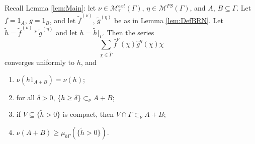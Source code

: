 \documentclass[12pt]{amsart} \usepackage{amsmath,centernot,amssymb,leftindex}
\numberwithin{theorem}{section}
\numberwithin{equation}{section}
\theoremstyle{definition}
\begin{document}
	
	

	
\noindent Recall Lemma \ref{lem:Main}: 	let $\nu\in \mathcal M_{\tau}^{ext}(\Gamma)$, $\eta\in \mathcal M^{FS}(\Gamma)$, and $A$, $ B\subseteq \Gamma$.  Let $f=1_A$, $g=1_B$, and let $\tilde{f}^{(\nu)}$, $\tilde{g}^{(\eta)}$ be as in Lemma \ref{lem:DefBRN}.  Let $\tilde{h}=\tilde{f}^{(\nu)}*\tilde{g}^{(\eta)}$ and let $h=\tilde{h}|_{\Gamma}$.  Then the series
\begin{equation}\label{eq:RecallNuEtaConvolutionExpansion}
	\sum_{\chi\in\widehat{\Gamma}} \hat{f}^{\nu}(\chi)\hat{g}^{\eta}(\chi)\chi
\end{equation}
converges uniformly to $h$, and
\begin{enumerate}
	\item\label{item:RecallGeneralHAplusB} $\nu(h1_{A+B})=\nu(h)$;
	\item\label{item:RecallGeneralLevelContained} for all $\delta>0$, $\{h\geq \delta\}\subset_\nu A+B$;
	\item\label{item:RecallGeneralClopenSubset} if $V\subseteq \{\tilde{h}>0\}$ is compact, then $V\cap \Gamma \subset_{\nu} A+B$;
	\item\label{item:RecallGeneralMeasureOfAplusB} $\nu(A+B)\geq \mu_{b\Gamma}(\{\tilde{h}>0\})$.
\end{enumerate}

	

	
	
	
\end{document}
